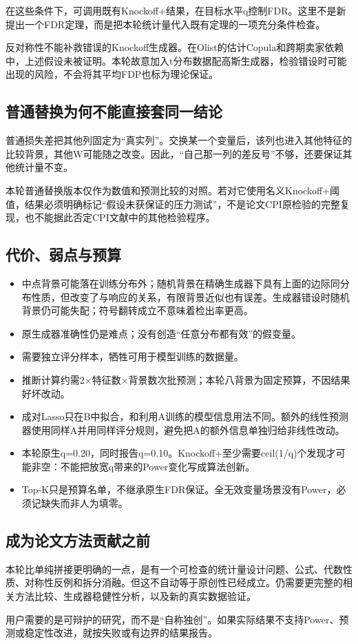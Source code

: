\documentclass[UTF8,11pt,a4paper]{ctexart}
\providecommand{\tightlist}{\setlength{\itemsep}{0pt}\setlength{\parskip}{0pt}}
\begin{document}
在这些条件下，可调用既有Knockoff+结果，在目标水平q控制FDR。这里不是新提出一个FDR定理，而是把本轮统计量代入既有定理的一项充分条件检查。

反对称性不能补救错误的Knockoff生成器。在Olist的估计Copula和跨期卖家依赖中，上述假设未被证明。本轮故意加入t分布数据配高斯生成器，检验错设时可能出现的风险，不会将其平均FDP也标为理论保证。

\subsection{普通替换为何不能直接套同一结论}\label{ux666eux901aux66ffux6362ux4e3aux4f55ux4e0dux80fdux76f4ux63a5ux5957ux540cux4e00ux7ed3ux8bba}

普通损失差把其他列固定为``真实列''。交换某一个变量后，该列也进入其他特征的比较背景，其他W可能随之改变。因此，``自己那一列的差反号''不够，还要保证其他统计量不变。

本轮普通替换版本仅作为数值和预测比较的对照。若对它使用名义Knockoff+阈值，结果必须明确标记``假设未获保证的压力测试''，不是论文CPI原检验的完整复现，也不能据此否定CPI文献中的其他检验程序。

\subsection{代价、弱点与预算}\label{ux4ee3ux4ef7ux5f31ux70b9ux4e0eux9884ux7b97}

\begin{itemize}
\tightlist
\item
  中点背景可能落在训练分布外；随机背景在精确生成器下具有上面的边际同分布性质，但改变了与响应的关系，有限背景近似也有误差。生成器错设时随机背景仍可能失配；符号翻转成立不意味着检出率更高。
\item
  原生成器准确性仍是难点；没有创造``任意分布都有效''的假变量。
\item
  需要独立评分样本，牺牲可用于模型训练的数据量。
\item
  推断计算约需2×特征数×背景数次批预测；本轮八背景为固定预算，不因结果好坏改动。
\item
  成对Lasso只在B中拟合，和利用A训练的模型信息用法不同。额外的线性预测器使用同样A并用同样评分规则，避免把A的额外信息单独归给非线性改动。
\item
  本轮原生q=0.20，同时报告q=0.10。Knockoff+至少需要ceil(1/q)个发现才可能非空：不能把放宽q带来的Power变化写成算法创新。
\item
  Top-K只是预算名单，不继承原生FDR保证。全无效变量场景没有Power，必须记缺失而非人为填零。
\end{itemize}

\subsection{成为论文方法贡献之前}\label{ux6210ux4e3aux8bbaux6587ux65b9ux6cd5ux8d21ux732eux4e4bux524d}

本轮比单纯拼接更明确的一点，是有一个可检查的统计量设计问题、公式、代数性质、对称性反例和拆分消融。但这不自动等于原创性已经成立。仍需要更完整的相关方法比较、生成器稳健性分析，以及新的真实数据验证。

用户需要的是可辩护的研究，而不是``自称独创''。如果实际结果不支持Power、预测或稳定性改进，就按失败或有边界的结果报告。
\end{document}
